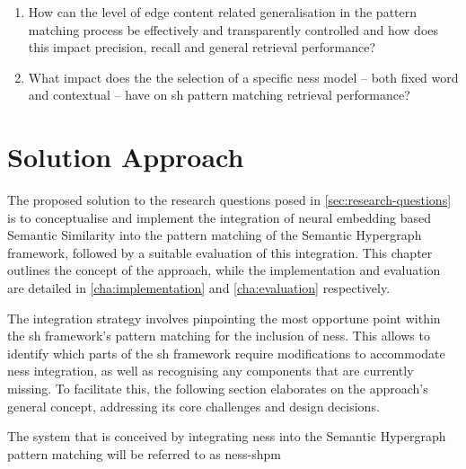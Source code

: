 \documentclass[11pt]{scrreprt}
\begin{document}
\begin{enumerate}[label=\textbf{R.\arabic*}, leftmargin=0pt, labelwidth=*, align=left, labelsep=0.5em, itemindent=0pt, listparindent=\parindent]
    \item How can the level of edge content related generalisation in the pattern matching process be effectively and transparently controlled and how does this impact precision, recall and general retrieval performance?

    \item What impact does the the selection of a specific \gls{ness} model -- both fixed word and contextual -- have on \gls{sh} pattern matching retrieval performance?
\end{enumerate}


\chapter{Solution Approach}
\label{cha:solution-approach}

The proposed solution to the research questions posed in \cref{sec:research-questions} is to conceptualise and implement the integration of neural embedding based Semantic Similarity into the pattern matching of the Semantic Hypergraph framework, followed by a suitable evaluation of this integration. This chapter outlines the concept of the approach, while the implementation and evaluation are detailed in \cref{cha:implementation} and \cref{cha:evaluation} respectively.

The integration strategy involves pinpointing the most opportune point within the \gls{sh} framework's pattern matching for the inclusion of \gls{ness}. This  allows to identify which parts of the \gls{sh} framework require modifications to accommodate \gls{ness} integration, as well as recognising any components that are currently missing. To facilitate this, the following section elaborates on the approach's general concept, addressing its core challenges and design decisions. 

The system that is conceived by integrating \gls{ness} into the Semantic Hypergraph pattern matching will be  referred to as \gls{ness-shpm}
\end{document}
